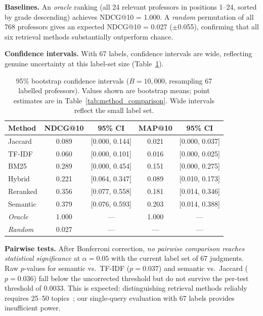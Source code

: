 \documentclass[11pt,a4paper]{article}
\begin{document}
\textbf{Baselines.} An \emph{oracle} ranking (all 24 relevant professors
in positions 1--24, sorted by grade descending) achieves NDCG@10 = 1.000.
A \emph{random} permutation of all 768 professors gives an expected
NDCG@10 = 0.027 ($\pm$0.055), confirming that all six retrieval methods
substantially outperform chance.

\textbf{Confidence intervals.}
With 67 labels, confidence intervals are wide, reflecting genuine
uncertainty at this label-set size (Table~\ref{tab:ci}).

\begin{table}[H]
\centering
\caption{95\% bootstrap confidence intervals ($B=10{,}000$, resampling
67 labelled professors). Values shown are bootstrap means; point
estimates are in Table~\ref{tab:method_comparison}. Wide intervals
reflect the small label set.}
\label{tab:ci}
\begin{tabular}{lcccc}
\toprule
\textbf{Method} & \textbf{NDCG@10} & \textbf{95\% CI} &
\textbf{MAP@10} & \textbf{95\% CI} \\
\midrule
Jaccard   & 0.089 & [0.000, 0.144] & 0.021 & [0.000, 0.037] \\
TF-IDF    & 0.060 & [0.000, 0.101] & 0.016 & [0.000, 0.025] \\
BM25      & 0.289 & [0.000, 0.454] & 0.151 & [0.000, 0.275] \\
Hybrid    & 0.221 & [0.064, 0.347] & 0.089 & [0.010, 0.173] \\
Reranked  & 0.356 & [0.077, 0.558] & 0.181 & [0.014, 0.346] \\
Semantic  & 0.379 & [0.076, 0.593] & 0.203 & [0.014, 0.388] \\
\midrule
\textit{Oracle}  & 1.000 & --- & 1.000 & --- \\
\textit{Random}  & 0.027 & --- & ---   & --- \\
\bottomrule
\end{tabular}
\end{table}

\textbf{Pairwise tests.}
After Bonferroni correction, \emph{no pairwise comparison reaches
statistical significance} at $\alpha = 0.05$ with the current label
set of 67 judgments. Raw $p$-values for semantic vs.\ TF-IDF ($p = 0.037$)
and semantic vs.\ Jaccard ($p = 0.036$) fall below the uncorrected
threshold but do not survive the per-test threshold of 0.0033.
This is expected: distinguishing retrieval methods reliably requires
25--50 topics~\cite{voorhees2002topic}; our single-query
evaluation with 67 labels provides insufficient power.
\end{document}
